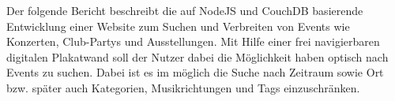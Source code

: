 \thispagestyle{empty}

\begin{tabular}{c}
 \\ 
\end{tabular} 


\vspace{4cm}
\begin{figure}[h] %
\end{figure}

\vspace{1cm}
Der folgende Bericht beschreibt die auf NodeJS und CouchDB basierende Entwicklung einer Website zum Suchen und Verbreiten von Events wie Konzerten, Club-Partys und Ausstellungen. Mit Hilfe einer frei navigierbaren digitalen Plakatwand soll der Nutzer dabei die Möglichkeit haben optisch nach Events zu suchen. Dabei ist es im möglich die Suche nach Zeitraum sowie Ort bzw. später auch Kategorien, Musikrichtungen und Tags einzuschränken.


